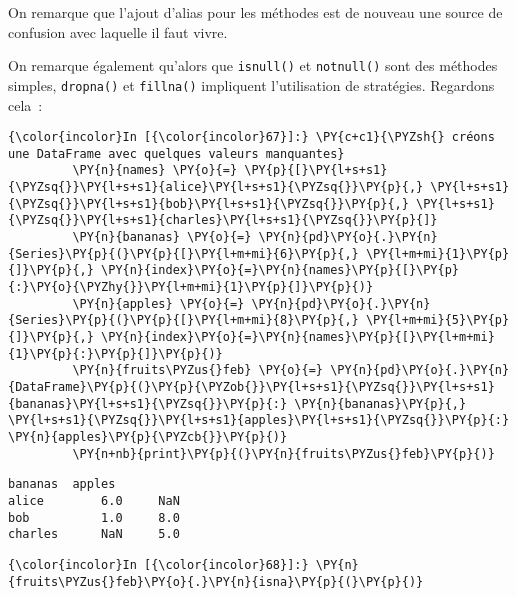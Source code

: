 On remarque que l'ajout d'alias pour les méthodes est de nouveau une
source de confusion avec laquelle il faut vivre.

On remarque également qu'alors que \texttt{isnull()} et
\texttt{notnull()} sont des méthodes simples, \texttt{dropna()} et
\texttt{fillna()} impliquent l'utilisation de stratégies. Regardons
cela~:

    \begin{Verbatim}[commandchars=\\\{\},frame=single,framerule=0.3mm,rulecolor=\color{cellframecolor}]
{\color{incolor}In [{\color{incolor}67}]:} \PY{c+c1}{\PYZsh{} créons une DataFrame avec quelques valeurs manquantes}
         \PY{n}{names} \PY{o}{=} \PY{p}{[}\PY{l+s+s1}{\PYZsq{}}\PY{l+s+s1}{alice}\PY{l+s+s1}{\PYZsq{}}\PY{p}{,} \PY{l+s+s1}{\PYZsq{}}\PY{l+s+s1}{bob}\PY{l+s+s1}{\PYZsq{}}\PY{p}{,} \PY{l+s+s1}{\PYZsq{}}\PY{l+s+s1}{charles}\PY{l+s+s1}{\PYZsq{}}\PY{p}{]}
         \PY{n}{bananas} \PY{o}{=} \PY{n}{pd}\PY{o}{.}\PY{n}{Series}\PY{p}{(}\PY{p}{[}\PY{l+m+mi}{6}\PY{p}{,} \PY{l+m+mi}{1}\PY{p}{]}\PY{p}{,} \PY{n}{index}\PY{o}{=}\PY{n}{names}\PY{p}{[}\PY{p}{:}\PY{o}{\PYZhy{}}\PY{l+m+mi}{1}\PY{p}{]}\PY{p}{)}
         \PY{n}{apples} \PY{o}{=} \PY{n}{pd}\PY{o}{.}\PY{n}{Series}\PY{p}{(}\PY{p}{[}\PY{l+m+mi}{8}\PY{p}{,} \PY{l+m+mi}{5}\PY{p}{]}\PY{p}{,} \PY{n}{index}\PY{o}{=}\PY{n}{names}\PY{p}{[}\PY{l+m+mi}{1}\PY{p}{:}\PY{p}{]}\PY{p}{)}
         \PY{n}{fruits\PYZus{}feb} \PY{o}{=} \PY{n}{pd}\PY{o}{.}\PY{n}{DataFrame}\PY{p}{(}\PY{p}{\PYZob{}}\PY{l+s+s1}{\PYZsq{}}\PY{l+s+s1}{bananas}\PY{l+s+s1}{\PYZsq{}}\PY{p}{:} \PY{n}{bananas}\PY{p}{,} \PY{l+s+s1}{\PYZsq{}}\PY{l+s+s1}{apples}\PY{l+s+s1}{\PYZsq{}}\PY{p}{:} \PY{n}{apples}\PY{p}{\PYZcb{}}\PY{p}{)}
         \PY{n+nb}{print}\PY{p}{(}\PY{n}{fruits\PYZus{}feb}\PY{p}{)}
\end{Verbatim}


    \begin{Verbatim}[commandchars=\\\{\},frame=single,framerule=0.3mm,rulecolor=\color{cellframecolor}]
         bananas  apples
alice        6.0     NaN
bob          1.0     8.0
charles      NaN     5.0
\end{Verbatim}

    \begin{Verbatim}[commandchars=\\\{\},frame=single,framerule=0.3mm,rulecolor=\color{cellframecolor}]
{\color{incolor}In [{\color{incolor}68}]:} \PY{n}{fruits\PYZus{}feb}\PY{o}{.}\PY{n}{isna}\PY{p}{(}\PY{p}{)}
\end{Verbatim}


